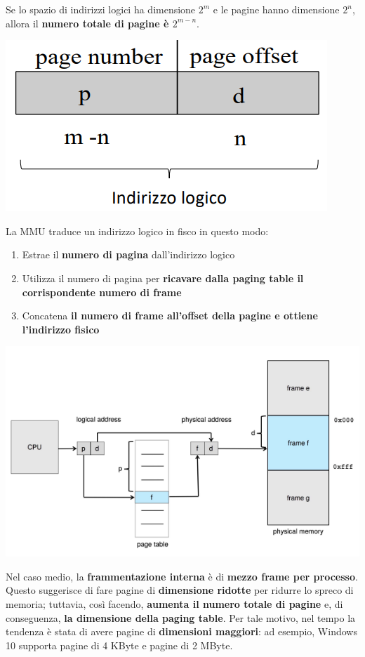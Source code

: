 \documentclass[12pt]{article}
\begin{document}
Se lo spazio di indirizzi logici ha dimensione $2^m$ e le pagine hanno dimensione $2^n$, allora il \textbf{numero totale di pagine è $2^{m-n}$}.
\begin{center}
    \includegraphics[width = 0.40\linewidth]{Images/59.png}
\end{center}
La MMU traduce un indirizzo logico in fisco in questo modo:
\begin{enumerate}
    \item Estrae il \textbf{numero di pagina} dall'indirizzo logico
    \item Utilizza il numero di pagina per \textbf{ricavare dalla paging table il corrispondente numero di frame}
    \item Concatena \textbf{il numero di frame all'offset della pagine e ottiene l'indirizzo fisico}
\end{enumerate}
\begin{center}
    \includegraphics[width = 0.80\linewidth]{Images/60.png}
\end{center}
Nel caso medio, la \textbf{frammentazione interna} è di \textbf{mezzo frame per processo}.
Questo suggerisce di fare pagine di \textbf{dimensione ridotte} per ridurre lo spreco di memoria; tuttavia, così facendo, \textbf{aumenta il numero totale di pagine} e, di conseguenza, \textbf{la dimensione della paging table}.
Per tale motivo, nel tempo la tendenza è stata di avere pagine di \textbf{dimensioni maggiori}: ad esempio, Windows 10 supporta pagine di 4 KByte e pagine di 2 MByte.
\end{document}
